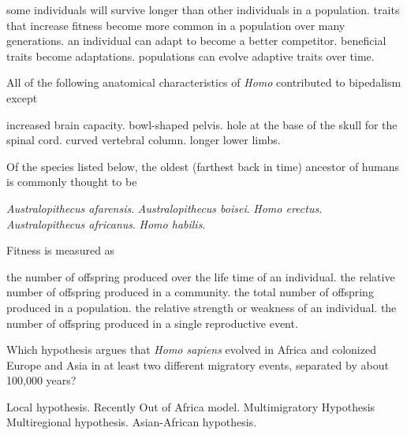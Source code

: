 \begin{choices}
\choice some individuals will survive longer than other individuals in a population.
\choice traits that increase fitness become more common in a population over many generations.
\correctchoice an individual can adapt to become a better competitor.
\choice beneficial traits become adaptations.
\choice populations can evolve adaptive traits over time.
\end{choices}

\question
All of the following anatomical characteristics of \emph{Homo} contributed to bipedalism except

\begin{choices}
\correctchoice increased brain capacity.
\choice bowl-shaped pelvis.
\choice hole at the base of the skull for the spinal cord.
\choice curved vertebral column.
\choice longer lower limbs.
\end{choices}

\question
Of the species listed below, the oldest (farthest back in time) ancestor of humans is commonly thought to be

\begin{choices}
\correctchoice \textit{Australopithecus afarensis}.
\choice \textit{Australopithecus boisei}.
\choice \textit{Homo erectus}.
\choice \textit{Australopithecus africanus}.
\choice \textit{Homo habilis}.
\end{choices}

\question
Fitness is measured as

\begin{choices}
\correctchoice the number of offspring produced over the life time of an individual.
\choice the relative number of offspring produced in a community.
\choice the total number of offspring produced in a population.
\choice the relative strength or weakness of an individual.
\choice the number of offspring produced in a single reproductive event.
\end{choices}

\question
Which hypothesis argues that \textit{Homo sapiens} evolved in Africa and colonized Europe and Asia in at least two different migratory events, separated by about 100,000 years?

\begin{choices}
\choice Local hypothesis.
\correctchoice Recently Out of Africa model.
\choice Multimigratory Hypothesis
\choice Multiregional hypothesis.
\choice Asian-African hypothesis.
\end{choices}

